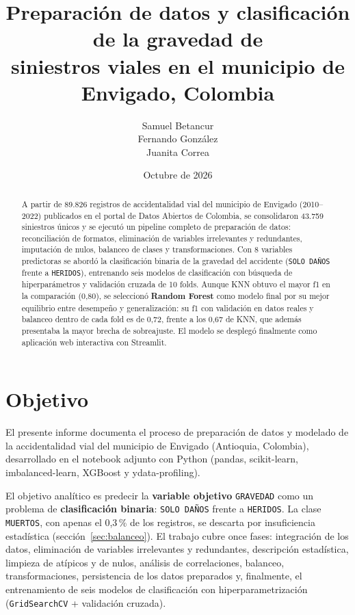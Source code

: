 \documentclass[11pt]{article}
\title{Preparación de datos y clasificación de la gravedad de\\ siniestros viales en el municipio de Envigado, Colombia}
\author{Samuel Betancur \\ Fernando González \\ Juanita Correa}
\date{Octubre de 2026}
\newcommand{\vartxt}[1]{\texttt{#1}}
\begin{document}
\maketitle

\begin{abstract}
\noindent
A partir de 89.826 registros de accidentalidad vial del municipio de Envigado (2010--2022) publicados en el portal de Datos Abiertos de Colombia, se consolidaron 43.759 siniestros únicos y se ejecutó un pipeline completo de preparación de datos: reconciliación de formatos, eliminación de variables irrelevantes y redundantes, imputación de nulos, balanceo de clases y transformaciones. Con 8 variables predictoras se abordó la clasificación binaria de la gravedad del accidente (\vartxt{SOLO DAÑOS} frente a \vartxt{HERIDOS}), entrenando seis modelos de clasificación con búsqueda de hiperparámetros y validación cruzada de 10 folds. Aunque KNN obtuvo el mayor f1 en la comparación (0,80), se seleccionó \textbf{Random Forest} como modelo final por su mejor equilibrio entre desempeño y generalización: su f1 con validación en datos reales y balanceo dentro de cada fold es de 0,72, frente a los 0,67 de KNN, que además presentaba la mayor brecha de sobreajuste. El modelo se desplegó finalmente como aplicación web interactiva con Streamlit.
\end{abstract}

\section{Objetivo}

El presente informe documenta el proceso de preparación de datos y modelado de la accidentalidad vial del municipio de Envigado (Antioquia, Colombia), desarrollado en el notebook adjunto con Python (pandas, scikit-learn, imbalanced-learn, XGBoost y ydata-profiling).

El objetivo analítico es predecir la \textbf{variable objetivo} \vartxt{GRAVEDAD} como un problema de \textbf{clasificación binaria}: \vartxt{SOLO DAÑOS} frente a \vartxt{HERIDOS}. La clase \vartxt{MUERTOS}, con apenas el 0,3\,\% de los registros, se descarta por insuficiencia estadística (sección~\ref{sec:balanceo}). El trabajo cubre once fases: integración de los datos, eliminación de variables irrelevantes y redundantes, descripción estadística, limpieza de atípicos y de nulos, análisis de correlaciones, balanceo, transformaciones, persistencia de los datos preparados y, finalmente, el entrenamiento de seis modelos de clasificación con hiperparametrización (\vartxt{GridSearchCV} + validación cruzada).
\end{document}

